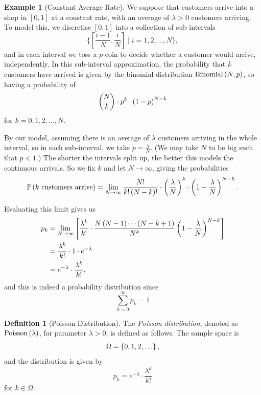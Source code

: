 \documentclass{article}
\theoremstyle{definition}
\newtheorem{definition}[theorem]{Definition}
\newtheorem{example}[theorem]{Example}
\theoremstyle{remark}
\newcommand{\Prob}{\mathbb{P}}
\newcommand{\ccintv}[2]{[#1,#2]}
\newcommand{\set}[2]{\{#1\mid #2\}}
\newcommand{\Binomial}{\operatorname{Binomial}}
\newcommand{\Poisson}{\operatorname{Poisson}}
\begin{document}
\begin{example}[Constant Average Rate]
    We suppose that customers arrive into a shop in \(\ccintv{0}{1}\) at a constant rate, with an average of \(\lambda > 0\) customers arriving. To model this, we discretise \(\ccintv{0}{1}\) into a collection of sub-intervals
    \[
        \set{\ccintv{\frac{i - 1}{N}}{\frac{i}{N}}}{i = 1, 2, \ldots, N},
    \]
    and in each interval we toss a \(p\)-coin to decide whether a customer would arrive, independently. In this sub-interval approximation, the probability that \(k\) customers have arrived is given by the binomial distribution \(\Binomial\pqty{N, p}\), so having a probability of
    \[
        \binom{N}{k} \cdot p^k \cdot \left(1 - p\right)^{N - k}
    \]
    for \(k = 0, 1, 2, \ldots, N\).

    By our model, assuming there is an average of \(\lambda\) customers arriving in the whole interval, so in each sub-interval, we take \(p = \frac{\lambda}{N}\). (We may take \(N\) to be big such that \(p < 1\).) The shorter the intervals split up, the better this models the continuous arrivals. So we fix \(k\) and let \(N \to \infty\), giving the probabilities
    \[
        \Prob\pqty{k\text{ customers arrive}} = \lim_{N \to \infty} \frac{N!}{k! \pqty{N - k}!} \cdot \pqty{\frac{\lambda}{N}}^k \cdot \pqty{1 - \frac{\lambda}{N}}^{N - k}.
    \]

    Evaluating this limit gives us
    \begin{align*}
        p_k &= \lim_{N \to \infty} \left[\frac{\lambda^k}{k!} \cdot \frac{N \left(N - 1\right) \cdots \left(N - k + 1\right)}{N^k} \left(1 - \frac{\lambda}{N}\right)^{N - k}\right]\\
        &= \frac{\lambda^k}{k!} \cdot 1 \cdot e^{-\lambda} \\
        &= e^{-\lambda} \cdot \frac{\lambda^{k}}{k!},
    \end{align*}
    and this is indeed a probability distribution since
    \[
        \sum_{k = 0}^{\infty} p_k = 1
    \]
\end{example}

\begin{definition}[Poisson Distribution]
    \label{def:poisson-distribution}%
    The \emph{Poisson distribution}, denoted as \(\Poisson\pqty{\lambda}\), for parameter \(\lambda > 0\), is defined as follows. The sample space is
    \[
        \Omega = \left\{0, 1, 2, \ldots\right\},
    \]
    and the distribution is given by
    \[
        p_k = e^{-\lambda} \cdot \frac{\lambda^k}{k!}
    \]
    for \(k \in \Omega\).
\end{definition}
\end{document}
